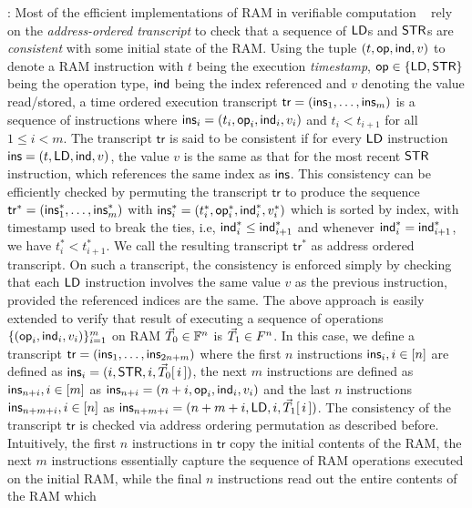 \documentclass[sigconf]{acmart}
\begin{document}
: Most of the efficient implementations of RAM in verifiable computation ~\cite{C:BCGTV13, NDSS:WSRBW15, SP:ZGKPP18}
rely on the {\em address-ordered transcript} to check that a sequence of $\mathsf{LD}$s and $\mathsf{STR}$s are {\em consistent} with some initial state
of the RAM. Using the tuple $(t,\mathsf{op},\mathsf{ind}, v)$ to denote a RAM instruction with $t$ being the execution {\em timestamp}, $\mathsf{op}\in \{\mathsf{LD},\mathsf{STR}\}$ being
the operation type, $\mathsf{ind}$ being the index referenced and $v$ denoting the value read/stored, a time ordered execution transcript $\mathsf{tr} = (\mathsf{ins}_1,\ldots,\mathsf{ins}_m)$ is a sequence
of instructions where $\mathsf{ins}_i=(t_i,\mathsf{op}_i,\mathsf{ind}_i, v_i)$ and $t_i < t_{i+1}$ for all $1\leq i<m$. The transcript $\mathsf{tr}$ is said to be consistent if
for every $\mathsf{LD}$ instruction $\mathsf{ins}=(t,\mathsf{LD},\mathsf{ind},v)$, the value $v$ is the same as that for the most recent $\mathsf{STR}$ instruction, which references the same index
as $\mathsf{ins}$. This consistency can be efficiently checked by permuting the transcript $\mathsf{tr}$ to produce the sequence
$\mathsf{tr}^\ast=(\mathsf{ins}_1^\ast,\ldots,\mathsf{ins}_m^\ast)$ with $\mathsf{ins}_i^\ast=(t_i^\ast,\mathsf{op}_i^\ast,\mathsf{ind}_i^\ast,v_i^\ast)$ which is sorted by index, with
timestamp used to break the ties, i.e, $\mathsf{ind}_i^\ast\leq \mathsf{ind}_{i+1}^\ast$ and whenever $\mathsf{ind}_i^\ast=\mathsf{ind}_{i+1}^\ast$, we have $t_i^\ast < t_{i+1}^\ast$.
We call the resulting transcript $\mathsf{tr}^\ast$ as address ordered transcript. On such a transcript, the consistency is enforced simply by
checking that each $\mathsf{LD}$ instruction involves the same value $v$ as the previous instruction, provided the referenced indices are the same.
The above approach is easily extended to verify that result of executing a sequence of operations $\{(\mathsf{op}_i,\mathsf{ind}_i,v_i)\}_{i=1}^m$ on
RAM $\vec{T}_0\in \mathbb{F}^n$ is $\vec{T}_1\in F^n$. In this case, we define a transcript $\mathsf{tr}=(\mathsf{ins}_1,\ldots,\mathsf{ins}_{2n+m})$ where the
first $n$ instructions $\mathsf{ins}_i,i\in [n]$ are defined as $\mathsf{ins}_i=(i,\mathsf{STR},i,\vec{T}_0[\,i\,])$, the next $m$ instructions are defined
as $\mathsf{ins}_{n+i},i\in [m]$ as $\mathsf{ins}_{n+i}=(n+i, \mathsf{op}_i, \mathsf{ind}_i, v_i)$ and the last $n$ instructions $\mathsf{ins}_{n+m+i}, i\in [n]$ as
$\mathsf{ins}_{n+m+i}=(n+m+i,\mathsf{LD},i,\vec{T}_1[\,i\,])$. The consistency of the transcript $\mathsf{tr}$ is checked via address ordering permutation as
described before. Intuitively, the first $n$ instructions in $\mathsf{tr}$ copy the initial contents of the RAM, the next $m$ instructions essentially
capture the sequence of RAM operations executed on the initial RAM, while the final $n$ instructions read out the entire contents of the RAM which
\end{document}
